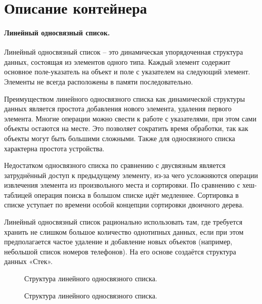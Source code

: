 \section{Описание контейнера}

\paragraph{Линейный односвязный список.}

Линейный односвязный список – это динамическая упорядоченная структура данных, состоящая из элементов одного типа. Каждый элемент содержит основное поле-указатель на объект и поле с указателем на следующий элемент. Элементы не всегда расположены в памяти последовательно.

Преимуществом линейного односвязного списка как динамической структуры данных является простота добавления нового элемента, удаления первого элемента. Многие операции можно свести к работе с указателями, при этом сами объекты остаются на месте.
Это позволяет сократить время обработки, так как объекты могут быть большими сложными. Также для односвязного списка характерна простота устройства.

Недостатком односвязного списка по сравнению с двусвязным является затруднённый доступ к предыдущему элементу, из-за чего усложняются операции извлечения элемента из произвольного места и сортировки. По сравнению с хеш-таблицей операция поиска в большом списке идёт медленнее. Сортировка в списке уступает по времени особой концепции сортировки двоичного дерева.

Линейный односвязный список рационально использовать там, где требуется хранить не слишком большое количество однотипных данных, если при этом предполагается частое удаление и добавление новых объектов (например, небольшой список номеров телефонов). На его основе создаётся структура данных «Стек». 

\begin{figure}[h]
\caption{Структура линейного односвязного списка.}
\end{figure}

\begin{figure}[h]
\caption{Структура линейного односвязного списка.}
\end{figure}